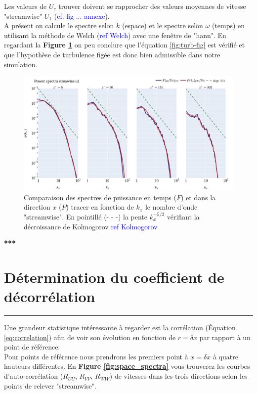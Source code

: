 \documentclass[12pt]{article}
\theoremstyle{plain}
\theoremstyle{remark}
\begin{document}
Les valeurs de $U_c$ trouver doivent se rapprocher des valeurs moyennes de vitesse "streamwise" $U_1$ (\textcolor{blue}{cf. fig ... annexe}).\\

A présent on calcule le spectre selon $k$ (espace) et le spectre
selon $\omega$ (temps) en utilisant la méthode de Welch (\textcolor{blue}{ref Welch}) avec une fenêtre de "hann". En regardant la {\bf Figure \ref{fig:spectra-space-time}} on peu conclure que l'équation \ref{fig:turb-fig} est vérifié et que l'hypothèse de turbulence figée est donc bien admissible dans notre simulation.

\begin{figure}[h!]
	\begin{center}
		\includegraphics[width=0.85\linewidth]{../../output/figures/channel_wrles_retau395/split_time/frozen_turbulence/power_spectra/u1.png}
		\caption{Comparaison des spectres de puissance en temps ($F$) et dans la direction $x$ ($P$) tracer en fonction de $k_x$ le nombre d'onde "streamwise". En pointillé (- - -) la pente $k_x^{-5/3}$ vérifiant la décroissance de Kolmogorov \textcolor{blue}{ref Kolmogorov}}
		\label{fig:spectra-space-time}
	\end{center}
\end{figure}
\pagebreak

\begin{center}
	\large \bf{***}
\end{center}

\vspace{0.3cm}
\section{Détermination du coefficient de décorrélation}
\noindent\rule{\linewidth}{2pt}
\vspace{0.1cm}

Une grandeur statistique intéressante à regarder est la corrélation (Équation \ref{eq:correlation}) afin de voir son évolution en fonction de $r=\delta x$ par rapport à un point de référence.\\
Pour points de référence nous prendrons les premiers point à $x=\delta x$ à quatre hauteurs différentes. En {\bf Figure \ref{fig:space_spectra}} vous trouverez les courbes d'auto-corrélation ($R_{UU}$, $R_{VV}$, $R_{WW}$) de vitesses dans les trois directions selon les points de relever "streamwise".  \\
\end{document}
